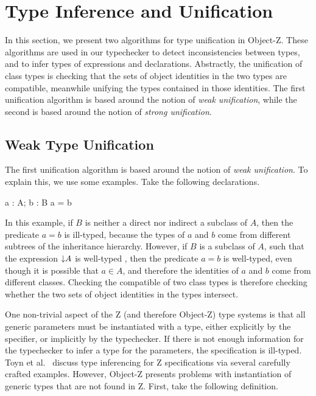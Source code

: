 \section{Type Inference and Unification}
\label{inference}

In this section, we present two algorithms for type unification in
Object-Z. These algorithms are used in our typechecker to detect
inconsistencies between types, and to infer types of expressions and
declarations. Abstractly, the unification of class types is checking
that the sets of object identities in the two types are compatible,
meanwhile unifying the types contained in those identities. The first
unification algorithm is based around the notion of {\em weak
unification}, while the second is based around the notion of {\em
strong unification}.

\subsection{Weak Type Unification}

The first unification algorithm is based around the notion of {\em
  weak unification}. To explain this, we use some  examples. Take the
  following declarations.

\begin{axdef}
  a : \poly A; b : B
\where
  a = b
\end{axdef}

In this example, if $B$ is neither a direct nor indirect a subclass of
$A$, then the predicate $a=b$ is ill-typed, because the types of $a$
and $b$ come from different subtrees of the inheritance
hierarchy. However, if $B$ is a subclass of $A$, such that the
expression $\mathord\downarrow A$ is well-typed , then the predicate $a=b$ is
well-typed, even though it is possible that $a \in A$, and therefore
the identities of $a$ and $b$ come from different classes. Checking
the compatible of two class types is therefore checking whether the
two sets of object identities in the types intersect.

One non-trivial aspect of the Z (and therefore Object-Z) type systems
is that all generic parameters must be instantiated with a type,
either explicitly by the specifier, or implicitly by the
typechecker. If there is not enough information for the typechecker to
infer a type for the parameters, the specification is ill-typed. Toyn
et al.\ \cite{toyn00} discuss type inferencing for Z specifications
via several carefully crafted examples. However, Object-Z presents
problems with instantiation of generic types that are not found in
Z. First, take the following definition.

